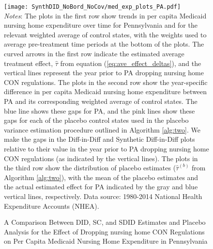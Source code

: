 \documentclass[../Main.tex]{subfiles}
\begin{document}
\newpage
{}
\begin{figure}[t] 
    \setlength{}
	\caption{\label{fig:med_exp_plots_pa} \centering A Comparison Between DID, SC, and SDID Estimates and Placebo Analysis for the Effect of Dropping nursing home CON Regulations on Per Capita Medicaid Nursing Home Expenditure in Pennsylvania} {\centering\texttt{[image: SynthDID\_NoBord\_NoCov/med\_exp\_plots\_PA.pdf]}}
    \vspace{-1.4cm}\\
    \scriptsize
		\textit{Notes}: The plots in the first row show trends in per capita Medicaid nursing home expenditure over time for Pennsylvania and for the relevant weighted average of control states, with the weights used to average pre-treatment time periods at the bottom of the plots. The curved arrows in the first row indicate the estimated average treatment effect, $\hat{\tau}$ from equation (\ref{eq:ave_effect_deltas}), and the vertical lines represent the year prior to PA dropping nursing home CON regulations. The plots in the second row show the year-specific difference in per capita Medicaid nursing home expenditure between PA and its corresponding weighted average of control states. The blue line shows these gaps for PA, and the pink lines show these gaps for each of the placebo control states used in the placebo variance estimation procedure outlined in Algorithm \ref{alg:two}. We make the gaps in the Diff-in-Diff and Synthetic Diff-in-Diff plots relative to their value in the year prior to PA dropping nursing home CON regulations (as indicated by the vertical lines). The plots in the third row show the distribution of placebo estimates ($\hat{\tau}^{(b)}$ from Algorithm \ref{alg:two}), with the mean of the placebo estimates and the actual estimated effect for PA indicated by the gray and blue vertical lines, respectively. Data source: 1980-2014 National Health Expenditure Accounts (NHEA).
\end{figure}
\restoregeometry
\clearpage
\end{document}
